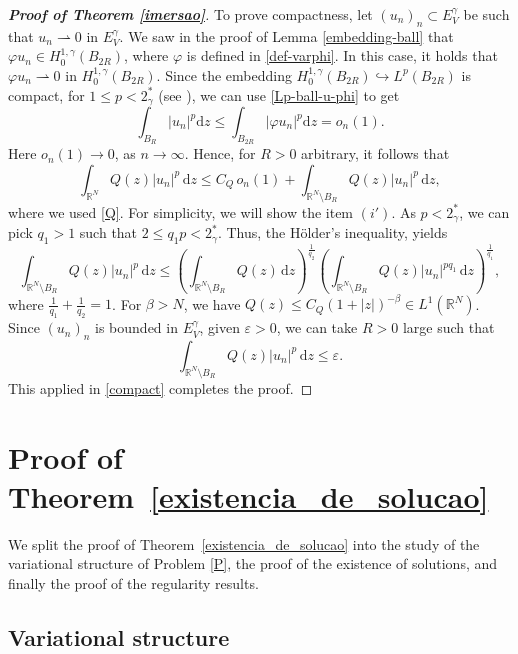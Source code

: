 \documentclass[12pt]{amsart}
\begin{document}
\begin{proof}[\textbf{\textit{Proof of Theorem \ref{imersao}}}]
To prove compactness, let $(u_n)_n \subset E_V^\gamma$ be such that $u_n \rightharpoonup 0$ in $E_V^\gamma$. We saw in the proof of Lemma \ref{embedding-ball} that $\varphi u_n  \in H^{1,\gamma}_0(B_{2R})$, where $\varphi$ is defined in \eqref{def-varphi}. In this case, it holds that $\varphi u_n  \rightharpoonup 0$ in $H^{1,\gamma}_0(B_{2R})$.  Since the embedding $H_0^{1,\gamma}(B_{2R}) \hookrightarrow L^p(B_{2R})$ is compact, for $1 \leq p <2_\gamma^*$ (see \cite[Theorem 3.3]{Kogoj-Lan-12}), we can use \eqref{Lp-ball-u-phi} to get
$$
\int_{B_R}|u_n|^p \mathrm{d}z \leq \int_{B_{2R}}|\varphi u_n|^p \mathrm{d}z = o_n(1).
$$
Here \(o_n(1) \to 0\), as \(n\to \infty\). Hence, for \(R>0\) arbitrary, it follows that
\begin{equation}\label{compact}
\int_{\mathbb{R}^N}Q(z)|u_n|^p \, \mathrm{d}z \leq C_Q\, o_n(1) + \int_{\mathbb{R}^N \setminus B_R}Q(z)|u_n|^p \, \mathrm{d}z,
\end{equation}
where we used \ref{Q}. For simplicity, we will show the item $(i')$. As $p<2_\gamma^*$, we can pick $q_1>1$ such that $2 \leq q_1 p <2_\gamma^*$. Thus, the Hölder's inequality, yields 
$$
\int_{\mathbb{R}^N \setminus B_R}Q(z)|u_n|^p \, \mathrm{d}z \leq \left(\int_{\mathbb{R}^N \setminus B_R} Q(z) \, \mathrm{d}z\right)^{\frac{1}{q_2}}\left(\int_{\mathbb{R}^N \setminus B_R} Q(z)|u_n|^{pq_1} \, \mathrm{d}z\right)^{\frac{1}{q_1}},
$$
where $\frac{1}{q_1}+\frac{1}{q_2}=1$. For $\beta>N$, we have $Q(z) \leq  C_Q(1+|z|)^{-\beta} \in L^1(\mathbb{R}^N)$. Since $(u_n)_n$ is bounded in $E_V^\gamma$, given $\varepsilon>0$, we can take $R>0$ large such that 
$$
\int_{\mathbb{R}^N \setminus B_R}Q(z)|u_n|^p \, \mathrm{d}z \leq \varepsilon.
$$
This applied in \eqref{compact} completes the proof.
\end{proof}


    



\section{Proof of Theorem~\ref{existencia_de_solucao}}

We split the proof of Theorem~\ref{existencia_de_solucao} into the study of the variational structure of Problem \eqref{P}, the proof of the existence of solutions, and finally the proof of the regularity results.

\subsection{Variational structure}
\end{document}
